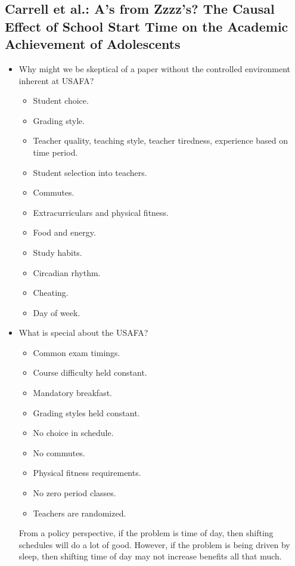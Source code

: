 \documentclass[10pt]{extarticle}
\begin{document}
  \subsection{Carrell et al.: A's from Zzzz's? The Causal Effect of School Start Time on the Academic Achievement of Adolescents}%
  \begin{itemize}
    \item Why might we be skeptical of a paper without the controlled environment inherent at USAFA?
      \begin{itemize}
        \item Student choice.
        \item Grading style.
        \item Teacher quality, teaching style, teacher tiredness, experience based on time period.
        \item Student selection into teachers.
        \item Commutes.
        \item Extracurriculars and physical fitness.
        \item Food and energy.
        \item Study habits.
        \item Circadian rhythm.
        \item Cheating.
        \item Day of week.
      \end{itemize}
    \item What is special about the USAFA?
      \begin{itemize}
        \item Common exam timings.
        \item Course difficulty held constant.
        \item Mandatory breakfast.
        \item Grading styles held constant.
        \item No choice in schedule.
        \item No commutes.
        \item Physical fitness requirements.
        \item No zero period classes.
        \item Teachers are randomized.
      \end{itemize}
      From a policy perspective, if the problem is time of day, then shifting schedules will do a lot of good. However, if the problem is being driven by sleep, then shifting time of day may not increase benefits all that much.

\end{itemize}
\end{document}
